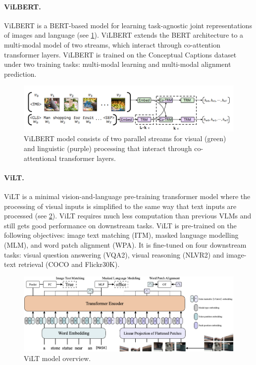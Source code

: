 \paragraph{ViLBERT.} ViLBERT \cite{lu2019vilbert} is a BERT-based model for learning task-agnostic joint representations of images and language (see \cref{fig:vilbert}). ViLBERT extends the BERT architecture to a multi-modal model of two streams, which interact through co-attention transformer layers. ViLBERT is trained on the Conceptual Captions dataset under two training tasks: multi-modal learning and multi-modal alignment prediction.

\begin{figure}[ht]
    \centering
    \includegraphics[width=\linewidth]{images/models/vilbert.png}
    \caption{ViLBERT model consists of two parallel streams for visual (green) and linguistic (purple) processing that interact through co-attentional transformer layers.}
    \label{fig:vilbert}
\end{figure}

\paragraph{ViLT.} ViLT \cite{kim2021vilt} is a minimal vision-and-language pre-training transformer model where the processing of visual inputs is simplified to the same way that text inputs are processed (see \cref{fig:vilt}). ViLT requires much less computation than previous VLMs and still gets good performance on downstream tasks. ViLT is pre-trained on the following objectives: image text matching (ITM), masked language modelling (MLM), and word patch alignment (WPA). It is fine-tuned on four downstream tasks: visual question answering (VQA2), visual reasoning (NLVR2) and image-text retrieval (COCO and Flickr30K).

\begin{figure}[ht]
    \centering
    \includegraphics[width=\linewidth]{images/models/vilt.png}
    \caption{ViLT model overview.}
    \label{fig:vilt}
\end{figure}

